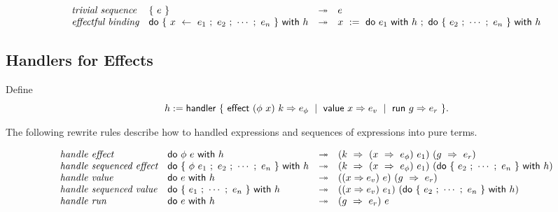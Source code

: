 \documentclass{article}
\begin{document}
\[ \begin{array}{llcl}
  \textit{trivial sequence} &
    \{~e~\} &\twoheadrightarrow& e
  \\
  \textit{effectful binding} &
    \textsf{do}~\{~x~\leftarrow~e_1~;~e_2~;~\cdots~;~e_n~\}~\textsf{with}~h &\twoheadrightarrow&
      x~:=~\textsf{do}~e_1~\textsf{with}~h~;~
      \textsf{do}~\{~e_2~;~\cdots~;~e_n~\}~\textsf{with}~h
\end{array} \]

\subsection{Handlers for Effects}

Define
\[
  h :=
  \textsf{handler}~\{~
    \textsf{effect}~(\phi~x)~k \Rightarrow e_\phi~\mid~
    \textsf{value}~x \Rightarrow e_v~\mid~
    \textsf{run}~g \Rightarrow e_r
  ~\}
  .
\]

\noindent
The following rewrite rules describe how to handled expressions and sequences of expressions into pure terms.

\[ \begin{array}{llcl}
  \textit{handle effect} &
  \textsf{do}~\phi~e~\textsf{with}~h &\twoheadrightarrow&
    (k~\Rightarrow~(x~\Rightarrow~e_\phi)~e_1)~
    (g~\Rightarrow~e_r)
  \\
  \textit{handle sequenced effect} &
  \textsf{do}~\{~\phi~e_1~;~e_2~;~\cdots~;~e_n~\}~\textsf{with}~h &\twoheadrightarrow&
    (k~\Rightarrow~(x~\Rightarrow~e_\phi)~e_1)~
    (\textsf{do}~\{~e_2~;~\cdots~;~e_n~\}~\textsf{with}~h)
  \\

  \textit{handle value} &
  \textsf{do}~e~\textsf{with}~h &\twoheadrightarrow&
    ((x \Rightarrow e_v)~e)~
    (g~\Rightarrow~e_r)
  \\
  \textit{handle sequenced value} &
  \textsf{do}~\{~e_1~;~\cdots~;~e_n~\}~\textsf{with}~h &\twoheadrightarrow&
    ((x \Rightarrow e_v)~e_1)~
    (\textsf{do}~\{~e_2~;~\cdots~;~e_n~\}~\textsf{with}~h)
  \\

  \textit{handle run} &
  \textsf{do}~e~\textsf{with}~h &\twoheadrightarrow&
    (g~\Rightarrow~e_r)~e
\end{array} \]
\end{document}
